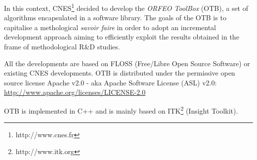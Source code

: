 In this context, CNES\footnote{http://www.cnes.fr} decided to develop
the \emph{ORFEO ToolBox} (OTB), a set of algorithms encapsulated in a
software library. The goals of the OTB is to capitalise a methological
\textit{savoir faire} in order to adopt an incremental development
approach aiming to efficiently exploit the results obtained in the
frame of methodological R\&D studies.

All the developments are based on FLOSS (Free/Libre Open Source Software) or
existing CNES developments. OTB is distributed under the permissive open
source license Apache v2.0 - aka Apache Software License (ASL) v2.0:\\
\url{http://www.apache.org/licenses/LICENSE-2.0}

OTB is implemented in C++ and is mainly based on
ITK\footnote{http://www.itk.org} (Insight Toolkit).







